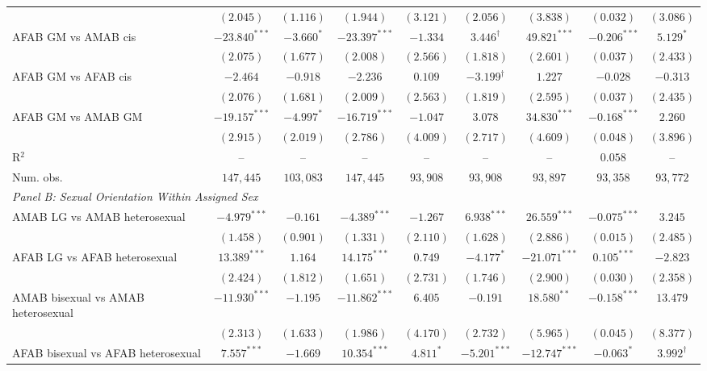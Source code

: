 \begin{table}[htpb!]
{\begin{tabular}{l c c c c c c c c}
 & $(2.045)$ & $(1.116)$ & $(1.944)$ & $(3.121)$ & $(2.056)$ & $(3.838)$ & $(0.032)$ & $(3.086)$ \\
AFAB GM vs AMAB cis & $-23.840^{***}$ & $-3.660^{*}$ & $-23.397^{***}$ & $-1.334$ & $3.446^{\dagger}$ & $49.821^{***}$ & $-0.206^{***}$ & $5.129^{*}$ \\
 & $(2.075)$ & $(1.677)$ & $(2.008)$ & $(2.566)$ & $(1.818)$ & $(2.601)$ & $(0.037)$ & $(2.433)$ \\
AFAB GM vs AFAB cis & $-2.464$ & $-0.918$ & $-2.236$ & $0.109$ & $-3.199^{\dagger}$ & $1.227$ & $-0.028$ & $-0.313$ \\
 & $(2.076)$ & $(1.681)$ & $(2.009)$ & $(2.563)$ & $(1.819)$ & $(2.595)$ & $(0.037)$ & $(2.435)$ \\
AFAB GM vs AMAB GM & $-19.157^{***}$ & $-4.997^{*}$ & $-16.719^{***}$ & $-1.047$ & $3.078$ & $34.830^{***}$ & $-0.168^{***}$ & $2.260$ \\
 & $(2.915)$ & $(2.019)$ & $(2.786)$ & $(4.009)$ & $(2.717)$ & $(4.609)$ & $(0.048)$ & $(3.896)$ \\
\hline
R$^2$ & -- & -- & -- & -- & -- & -- & $0.058$ & -- \\
Num. obs. & $147,445$ & $103,083$ & $147,445$ & $93,908$ & $93,908$ & $93,897$ & $93,358$ & $93,772$ \\
\hline
\multicolumn{9}{l}{\textit{Panel B: Sexual Orientation Within Assigned Sex}} \\
AMAB LG vs AMAB heterosexual & $-4.979^{***}$ & $-0.161$ & $-4.389^{***}$ & $-1.267$ & $6.938^{***}$ & $26.559^{***}$ & $-0.075^{***}$ & $3.245$ \\
 & $(1.458)$ & $(0.901)$ & $(1.331)$ & $(2.110)$ & $(1.628)$ & $(2.886)$ & $(0.015)$ & $(2.485)$ \\
AFAB LG vs AFAB heterosexual & $13.389^{***}$ & $1.164$ & $14.175^{***}$ & $0.749$ & $-4.177^{*}$ & $-21.071^{***}$ & $0.105^{***}$ & $-2.823$ \\
 & $(2.424)$ & $(1.812)$ & $(1.651)$ & $(2.731)$ & $(1.746)$ & $(2.900)$ & $(0.030)$ & $(2.358)$ \\
AMAB bisexual vs AMAB heterosexual & $-11.930^{***}$ & $-1.195$ & $-11.862^{***}$ & $6.405$ & $-0.191$ & $18.580^{**}$ & $-0.158^{***}$ & $13.479$ \\
 & $(2.313)$ & $(1.633)$ & $(1.986)$ & $(4.170)$ & $(2.732)$ & $(5.965)$ & $(0.045)$ & $(8.377)$ \\
AFAB bisexual vs AFAB heterosexual & $7.557^{***}$ & $-1.669$ & $10.354^{***}$ & $4.811^{*}$ & $-5.201^{***}$ & $-12.747^{***}$ & $-0.063^{*}$ & $3.992^{\dagger}$ \\

\end{tabular}}
\end{table}
